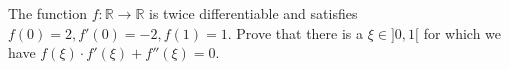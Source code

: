 The function $f: \mathbb{R}\rightarrow\mathbb{R}$ is twice differentiable and satisfies $f(0)=2,f'(0)=-2,f(1)=1$.
Prove that there is a $\xi \in ]0,1[$ for which we have $f(\xi)\cdot f'(\xi)+f''(\xi)=0$.